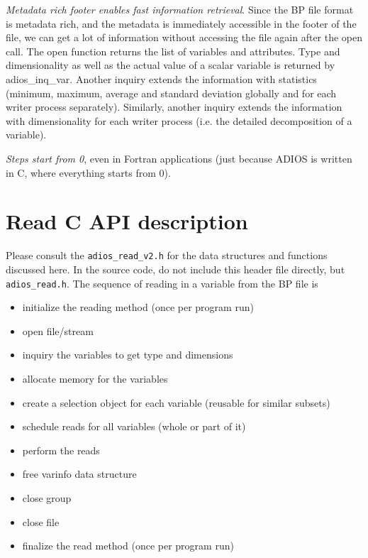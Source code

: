\emph{Metadata rich footer enables fast information retrieval}.
Since the BP file format is metadata rich, and the metadata is immediately accessible 
in the footer of the file, we can get a lot of information without accessing the file again
after the open call. 
The open function returns the list of variables and attributes. 
Type and dimensionality as well as the actual value of a scalar variable is returned by adios\_inq\_var.
Another inquiry extends the information with statistics (minimum, maximum, average and
standard deviation globally and for each writer process separately). Similarly, another inquiry
extends the information with dimensionality for each writer process 
(i.e. the detailed decomposition of a variable).


\emph{Steps start from 0}, even in Fortran applications (just because ADIOS is written in C, where everything starts from 0). 


\section{Read C API description}

Please consult the \verb+adios_read_v2.h+ for the data structures and functions discussed here. In the source code, do not include this header file directly, but \verb+adios_read.h+. The sequence of reading in a variable from the BP file is

\begin{itemize}
\renewcommand{\labelitemi}{$-$}
\item initialize the reading method (once per program run)

\item open file/stream

\item inquiry the variables to get type and dimensions

\item allocate memory for the variables

\item create a selection object for each variable (reusable for similar subsets)

\item schedule reads for all variables (whole or part of it)

\item perform the reads

\item free varinfo data structure

\item close group

\item close file

\item finalize the read method (once per program run)
\end{itemize}

